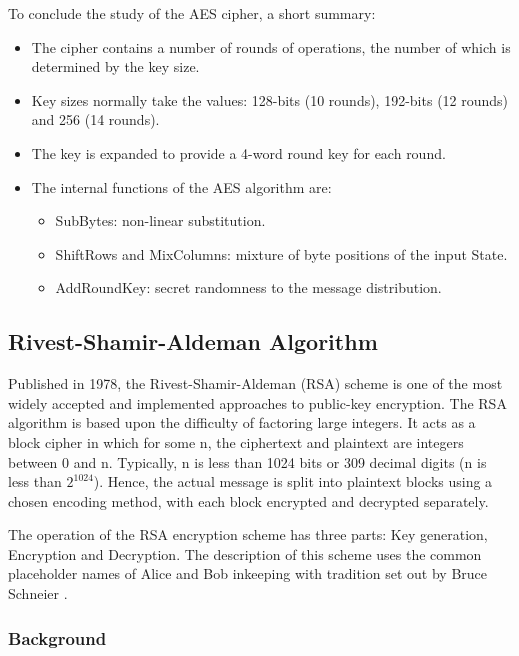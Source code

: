 \documentclass[a4paper,10pt]{report}
\begin{document}
To conclude the study of the AES cipher, a short summary:

\begin{itemize}
 \item The cipher contains a number of rounds of operations, the number of which is determined by the key size.
 \item Key sizes normally take the values: 128-bits (10 rounds), 192-bits (12 rounds) and 256 (14 rounds).
 \item The key is expanded to provide a 4-word round key for each round.
 \item The internal functions of the AES algorithm are:
    \begin{itemize}
     \item SubBytes: non-linear substitution.
     \item ShiftRows and MixColumns: mixture of byte positions of the input State.
     \item AddRoundKey: secret randomness to the message distribution.
    \end{itemize}

\end{itemize}

\subsection{Rivest-Shamir-Aldeman Algorithm}

Published in 1978, the Rivest-Shamir-Aldeman (RSA) scheme \cite{rsa} is one of the most widely accepted and implemented approaches to public-key encryption. The RSA algorithm is based upon the difficulty of factoring large integers. It acts as a block cipher in which for some n, the ciphertext and plaintext are integers between 0 and n. Typically, n is less than 1024 bits or 309 decimal digits (n is less than $2^{1024}$). Hence, the actual message is split into plaintext blocks using a chosen encoding method, with each block encrypted and decrypted separately. 

The operation of the RSA encryption scheme has three parts: Key generation, Encryption and Decryption. The description of this scheme uses the common placeholder names of Alice and Bob inkeeping with tradition set out by Bruce Schneier \cite{bruceschneier}.

\subsubsection{Background}
\end{document}

